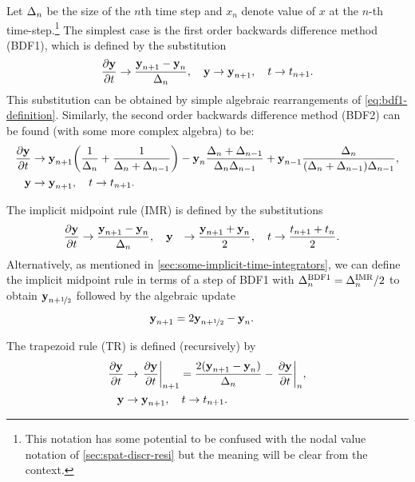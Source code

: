Let $\Delta_{n}$ be the size of the $n$th time step and $x_n$ denote value of $x$ at the $n$-th time-step.\footnote{This notation has some potential to be confused with the nodal value notation of \cref{sec:spat-discr-resi} but the meaning will be clear from the context.}
The simplest case is the first order backwards difference method (BDF1), which is defined by the substitution
\begin{equation}
    \frac{\partial \boldsymbol{\mathrm{y}}}{\partial t} \rightarrow \frac{\boldsymbol{\mathrm{y}}_{n+1} - \boldsymbol{\mathrm{y}}_n}{\Delta_{n}}, \quad
    \boldsymbol{\mathrm{y}} \rightarrow \boldsymbol{\mathrm{y}}_{n+1}, \quad t \rightarrow t_{n+1}.
    \label{eq:impl-bdf1}
\end{equation}
This substitution can be obtained by simple algebraic rearrangements of \cref{eq:bdf1-definition}.
Similarly, the second order backwards difference method (BDF2) can be found (with some more complex algebra) to be:
\begin{equation}
  \begin{aligned}
    \frac{\partial \boldsymbol{\mathrm{y}}}{\partial t} &\rightarrow \boldsymbol{\mathrm{y}}_{n+1}{\left( \frac{1}{\Delta_{n}} + \frac{1}{\Delta_{n} + \Delta_{n-1}} \right)}
    - \boldsymbol{\mathrm{y}}_n \frac{\Delta_{n} + \Delta_{n-1}}{\Delta_{n}\Delta_{n-1}}
    + \boldsymbol{\mathrm{y}}_{n-1} \frac{\Delta_{n}}{(\Delta_{n} + \Delta_{n-1})\Delta_{n-1}}, \\
    \boldsymbol{\mathrm{y}} &\rightarrow \boldsymbol{\mathrm{y}}_{n+1}, \quad t \rightarrow t_{n+1}.
    \label{eq:impl-bdf2}
  \end{aligned}
\end{equation}

The implicit midpoint rule (IMR) is defined by the substitutions
\begin{equation}
  \begin{aligned}
    \frac{\partial \boldsymbol{\mathrm{y}}}{\partial t} &\rightarrow \frac{\boldsymbol{\mathrm{y}}_{n+1} - \boldsymbol{\mathrm{y}}_n}{\Delta_{n}}, \quad
    \boldsymbol{\mathrm{y}} &\rightarrow \frac{\boldsymbol{\mathrm{y}}_{n+1} + \boldsymbol{\mathrm{y}}_n}{2}, \quad
    t &\rightarrow \frac{t_{n+1} + t_n}{2}.
    \label{eq:impl-imr}
  \end{aligned}
\end{equation}
Alternatively, as mentioned in \cref{sec:some-implicit-time-integrators}, we can define the implicit midpoint rule in terms of a step of BDF1 with $\Delta_{n}^{\mathrm{BDF1}} = \Delta_{n}^{\mathrm{IMR}}/2$ to obtain $\boldsymbol{\mathrm{y}}_{n+\nicefrac{1}{2}}$ followed by the algebraic update
\begin{equation}
  \begin{aligned}
    \label{eq:imr-bdf1}
    \boldsymbol{\mathrm{y}}_{n+1} &= 2\boldsymbol{\mathrm{y}}_{n+\nicefrac{1}{2}} - \boldsymbol{\mathrm{y}}_n.
  \end{aligned}
\end{equation}

The trapezoid rule (TR) is defined (recursively) by
\begin{equation}
  \begin{aligned}
    \frac{\partial \boldsymbol{\mathrm{y}}}{\partial t} &\rightarrow {\left. {\frac{\partial \boldsymbol{\mathrm{y}}}{\partial t}} \right|_{n+1}}
    = \frac{2(\boldsymbol{\mathrm{y}}_{n+1} - \boldsymbol{\mathrm{y}}_n)}{\Delta_{n}} - {\left. {\frac{\partial \boldsymbol{\mathrm{y}}}{\partial t}} \right|_{n}}, \\
    \boldsymbol{\mathrm{y}} &\rightarrow \boldsymbol{\mathrm{y}}_{n+1}, \quad t \rightarrow t_{n+1}.
    \label{eq:impl-tr}
  \end{aligned}
\end{equation}

